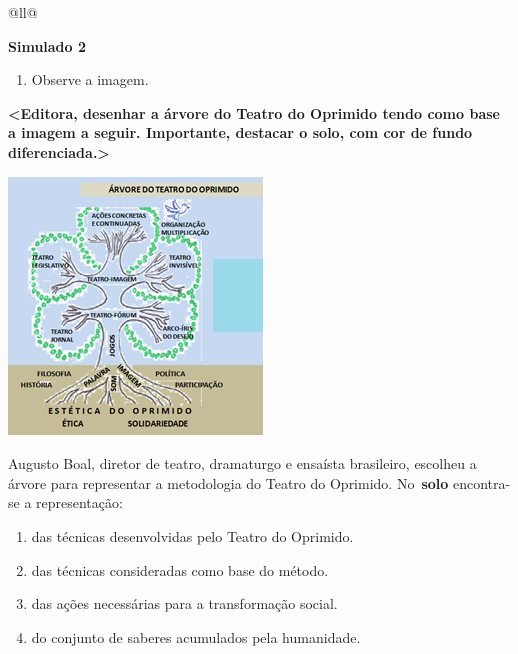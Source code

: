 \begin{itemize}
\begin{itemize}
\begin{escolha}[]{@{}ll@{}}


\textbf{Simulado 2}

\begin{enumerate}
\def\labelenumi{\arabic{enumi}.}
\item
  Observe a imagem.
\end{enumerate}

\textbf{\textless{}Editora, desenhar a árvore do Teatro do Oprimido
tendo como base a imagem a seguir. Importante, destacar o solo, com cor
de fundo diferenciada.\textgreater{}}

\includegraphics[width=2.65625in,height=2.69792in]{media/image30.png}

Augusto Boal, diretor de teatro, dramaturgo e ensaísta brasileiro,
escolheu a árvore para representar a metodologia do Teatro do Oprimido.
No~\textbf{solo} encontra-se a representação:

\begin{enumerate}
\def\labelenumi{\alph{enumi})}
\item
  das técnicas desenvolvidas pelo Teatro do Oprimido.
\item
  das técnicas consideradas como base do método.
\item
  das ações necessárias para a transformação social.
\item
  do conjunto de saberes acumulados pela humanidade.
\end{enumerate}


\end{escolha}
\end{itemize}
\end{itemize}
